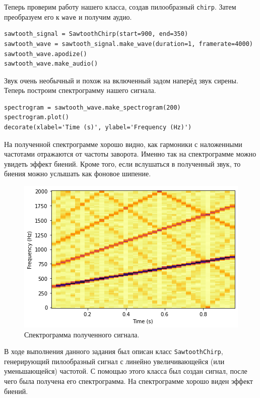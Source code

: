 \documentclass[a4paper, 14pt]{extarticle}
\begin{document}
    Теперь проверим работу нашего класса, создав пилообразный \texttt{chirp}.
    Затем преобразуем его к \texttt{wave} и получим аудио.

    \begin{lstlisting}[caption= Создание и работа с сигналом., label={lst:task2_work_with_chirp}]
sawtooth_signal = SawtoothChirp(start=900, end=350)
sawtooth_wave = sawtooth_signal.make_wave(duration=1, framerate=4000)
sawtooth_wave.apodize()
sawtooth_wave.make_audio()
    \end{lstlisting}

    Звук очень необычный и похож на включенный задом наперёд звук сирены. Теперь построим спектрограмму нашего сигнала.

    \begin{lstlisting}[caption= Создание и вывод спектрограммы., label={lst:task2_chirp_spectrogram}]
spectrogram = sawtooth_wave.make_spectrogram(200)
spectrogram.plot()
decorate(xlabel='Time (s)', ylabel='Frequency (Hz)')
    \end{lstlisting}

    На полученной спектрограмме хорошо видно, как гармоники с наложенными частотами отражаются от частоты заворота.
    Именно так на спектрограмме можно увидеть эффект биений. Кроме того, если вслушаться в полученный звук, то биения можно
    услышать как фоновое шипение.

    \begin{figure}[h]
        \centering
        \includegraphics[width=0.8\linewidth]{resources/Images/task2_spectrogram}
        \caption{Спектрограмма полученного сигнала.}
        \label{fig:task2_chirp_spectrogram}
    \end{figure}

    В ходе выполнения данного задания был описан класс \texttt{SawtoothChirp}, генерирующий пилообразный сигнал с линейно
    увеличивающейся (или уменьшающейся) частотой. С помощью этого класса был создан сигнал, после чего была получена его
    спектрограмма. На спектрограмме хорошо виден эффект биений.
\end{document}
